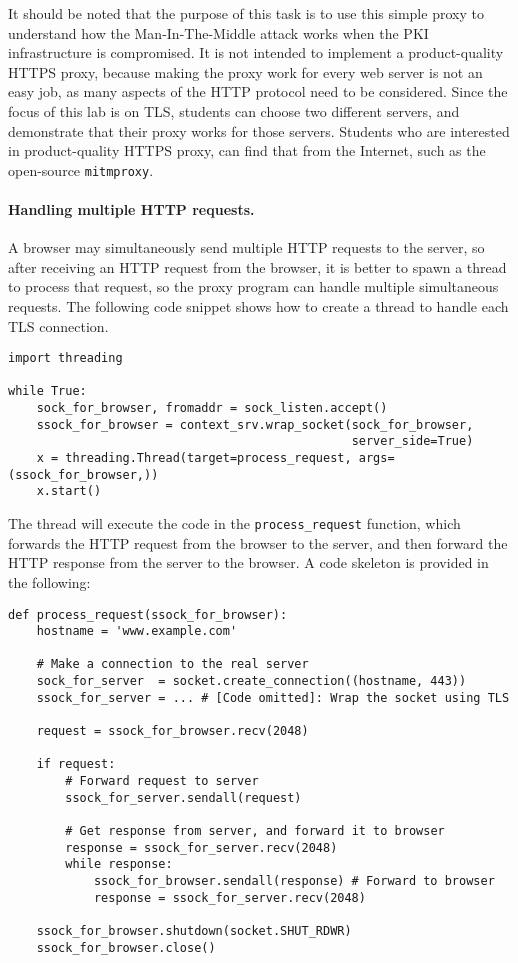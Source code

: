 It should be noted that the purpose of this task is to use 
this simple proxy to understand 
how the Man-In-The-Middle attack works when the 
PKI infrastructure is compromised. It is not intended 
to implement a product-quality HTTPS proxy, because
making the proxy work for every web server is not an 
easy job, as many aspects of the HTTP protocol need to be 
considered. Since the focus of this lab is on TLS, 
students can choose two different servers, 
and demonstrate that their proxy works for those servers. 
Students who are interested in product-quality HTTPS proxy,
can find that from the Internet, such as the open-source
\texttt{mitmproxy}.  


\paragraph{Handling multiple HTTP requests.}
A browser may simultaneously send multiple HTTP requests to the server,
so after receiving an HTTP request from the browser, it is better to spawn a thread
to process that request, so the proxy program can handle multiple simultaneous
requests. The following code snippet shows how to create a thread to handle 
each TLS connection.

\begin{lstlisting}
import threading

while True:
    sock_for_browser, fromaddr = sock_listen.accept()
    ssock_for_browser = context_srv.wrap_socket(sock_for_browser, 
                                                server_side=True)
    x = threading.Thread(target=process_request, args=(ssock_for_browser,))
    x.start()
\end{lstlisting}


The thread will execute the code in the \texttt{process\_request} function,
which forwards the HTTP request from the browser to the server, and 
then forward the HTTP response from the server to the browser. A code skeleton
is provided in the following:


\begin{lstlisting}
def process_request(ssock_for_browser):
    hostname = 'www.example.com'

    # Make a connection to the real server
    sock_for_server  = socket.create_connection((hostname, 443))
    ssock_for_server = ... # [Code omitted]: Wrap the socket using TLS

    request = ssock_for_browser.recv(2048)

    if request:
        # Forward request to server
        ssock_for_server.sendall(request)      

        # Get response from server, and forward it to browser
        response = ssock_for_server.recv(2048)
        while response:
            ssock_for_browser.sendall(response) # Forward to browser
            response = ssock_for_server.recv(2048)

    ssock_for_browser.shutdown(socket.SHUT_RDWR)
    ssock_for_browser.close()
\end{lstlisting}


